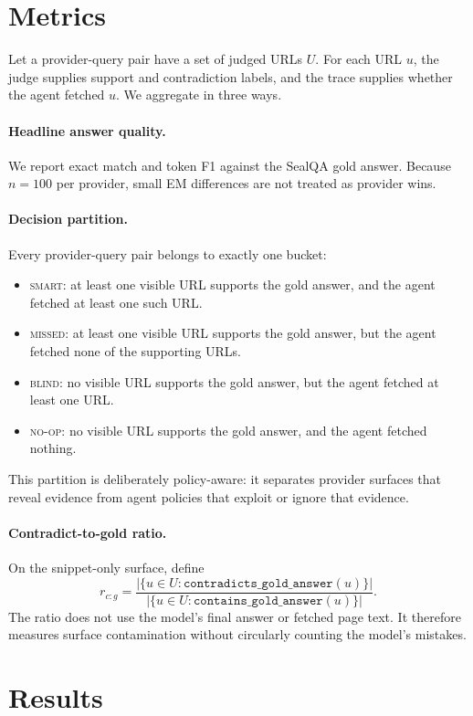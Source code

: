 \documentclass[11pt]{article}
\newcommand{\smart}{\textsc{smart}}
\newcommand{\missed}{\textsc{missed}}
\newcommand{\blind}{\textsc{blind}}
\newcommand{\noop}{\textsc{no-op}}
\newcommand{\containsGold}{\texttt{contains\_gold\_answer}}
\newcommand{\contraGold}{\texttt{contradicts\_gold\_answer}}
\begin{document}
\section{Metrics}
\label{sec:metrics}

Let a provider-query pair have a set of judged URLs $U$. For each URL $u$, the judge supplies support and contradiction labels, and the trace supplies whether the agent fetched $u$. We aggregate in three ways.

\paragraph{Headline answer quality.} We report exact match and token F1 against the SealQA gold answer. Because $n=100$ per provider, small EM differences are not treated as provider wins.

\paragraph{Decision partition.} Every provider-query pair belongs to exactly one bucket:
\begin{itemize}
    \item \smart{}: at least one visible URL supports the gold answer, and the agent fetched at least one such URL.
    \item \missed{}: at least one visible URL supports the gold answer, but the agent fetched none of the supporting URLs.
    \item \blind{}: no visible URL supports the gold answer, but the agent fetched at least one URL.
    \item \noop{}: no visible URL supports the gold answer, and the agent fetched nothing.
\end{itemize}
This partition is deliberately policy-aware: it separates provider surfaces that reveal evidence from agent policies that exploit or ignore that evidence.

\paragraph{Contradict-to-gold ratio.} On the snippet-only surface, define
\[
 r_{c:g}=\frac{\left|\{u \in U : \contraGold(u)\}\right|}{\left|\{u \in U : \containsGold(u)\}\right|}.
\]
The ratio does not use the model's final answer or fetched page text. It therefore measures surface contamination without circularly counting the model's mistakes.

\section{Results}
\label{sec:results}
\end{document}
